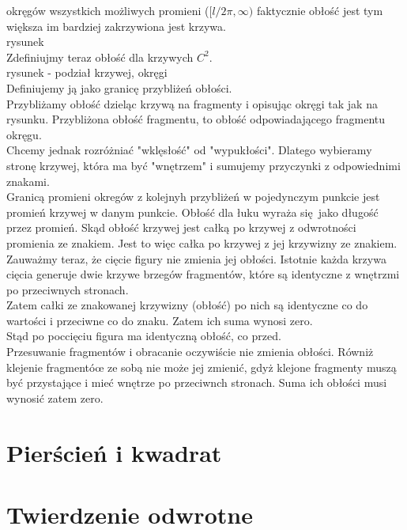 \documentclass[a4paper, 12pt]{article}
\begin{document}
okręgów wszystkich możliwych promieni ($[l/2\pi, \infty)$ faktycznie obłość jest tym większa im bardziej
zakrzywiona jest krzywa. \\
rysunek \\
Zdefiniujmy teraz obłość dla krzywych $C^2$. \\
rysunek - podział krzywej, okręgi \\
Definiujemy ją jako granicę przybliżeń obłości. \\
Przybliżamy obłość dzieląc krzywą na fragmenty i opisując okręgi tak jak na rysunku. Przybliżona obłość
fragmentu, to obłość odpowiadającego fragmentu okręgu. \\
Chcemy jednak rozróżniać "wklęsłość" od "wypukłości". Dlatego wybieramy stronę krzywej, która ma być
"wnętrzem" i sumujemy przyczynki z odpowiednimi znakami. \\

Granicą promieni okregów z kolejnyh przybliżeń w pojedynczym punkcie jest promień krzywej w danym punkcie.
Obłość dla łuku wyraża się jako długość przez promień. Skąd obłość krzywej jest całką po krzywej z
odwrotności promienia ze znakiem. Jest to więc całka po krzywej z jej krzywizny ze znakiem. \\
Zauważmy teraz, że cięcie figury nie zmienia jej obłości. Istotnie każda krzywa cięcia generuje dwie krzywe
brzegów fragmentów, które są identyczne z wnętrzmi po przeciwnych stronach. \\
Zatem całki ze znakowanej krzywizny (obłość) po nich są identyczne co do wartości i przeciwne co do znaku.
Zatem ich suma wynosi zero. \\
Stąd po poccięciu figura ma identyczną obłość, co przed. \\
Przesuwanie fragmentów i obracanie oczywiście nie zmienia obłości. Równiż klejenie fragmentóœ ze sobą nie
może jej zmienić, gdyż klejone fragmenty muszą być przystające i mieć wnętrze po przeciwnch stronach. Suma
ich obłości musi wynosić zatem zero. \\


\section{Pierścień i kwadrat}

\section{Twierdzenie odwrotne}
\end{document}
